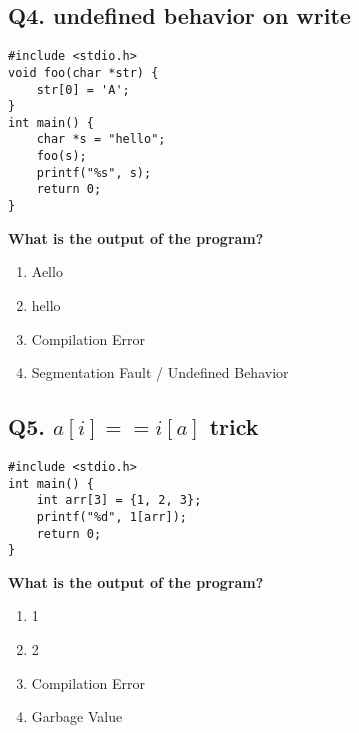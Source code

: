 \subsection*{Q4. undefined behavior on write}
\begin{verbatim}
#include <stdio.h>
void foo(char *str) {
    str[0] = 'A';
}
int main() {
    char *s = "hello";
    foo(s);
    printf("%s", s);
    return 0;
}
\end{verbatim}
\textbf{What is the output of the program?}

\begin{enumerate}[label=(\alph*)]
    \item Aello
    \item hello
    \item Compilation Error
    \item Segmentation Fault / Undefined Behavior
\end{enumerate}

\subsection*{Q5. $a[i] == i[a]$ trick}
\begin{verbatim}
#include <stdio.h>
int main() {
    int arr[3] = {1, 2, 3};
    printf("%d", 1[arr]);
    return 0;
}
\end{verbatim}
\textbf{What is the output of the program?}

\begin{enumerate}[label=(\alph*)]
    \item 1
    \item 2
    \item Compilation Error
    \item Garbage Value
\end{enumerate}


